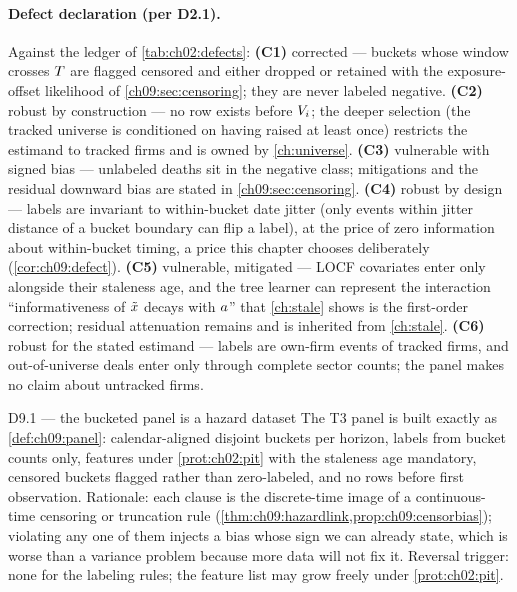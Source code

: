 \paragraph{Defect declaration (per D2.1).} Against the ledger of
\cref{tab:ch02:defects}: \textbf{(C1)} corrected --- buckets whose window
crosses $T$ are flagged censored and either dropped or retained with
the exposure-offset likelihood of \cref{ch09:sec:censoring}; they are
never labeled negative. \textbf{(C2)} robust by construction --- no row
exists before $V_i$; the deeper selection (the tracked universe is
conditioned on having raised at least once) restricts the estimand to
tracked firms and is owned by \cref{ch:universe}. \textbf{(C3)}
vulnerable with signed bias --- unlabeled deaths sit in the negative
class; mitigations and the residual downward bias are stated in
\cref{ch09:sec:censoring}. \textbf{(C4)} robust by design --- labels are
invariant to within-bucket date jitter (only events within jitter
distance of a bucket boundary can flip a label), at the price of zero
information about within-bucket timing, a price this chapter chooses
deliberately (\cref{cor:ch09:defect}). \textbf{(C5)} vulnerable,
mitigated --- LOCF covariates enter only alongside their staleness age,
and the tree learner can represent the interaction ``informativeness of
$\tilde{x}$ decays with $a$'' that \cref{ch:stale} shows is the
first-order correction; residual attenuation remains and is inherited
from \cref{ch:stale}. \textbf{(C6)} robust for the stated estimand ---
labels are own-firm events of tracked firms, and out-of-universe deals
enter only through complete sector counts; the panel makes no claim about
untracked firms.

\begin{decision}{D9.1 --- the bucketed panel is a hazard dataset}
The T3 panel is built exactly as \cref{def:ch09:panel}: calendar-aligned
disjoint buckets per horizon, labels from bucket counts only, features
under \cref{prot:ch02:pit} with the staleness age mandatory, censored
buckets flagged rather than zero-labeled, and no rows before first
observation. Rationale: each clause is the discrete-time image of a
continuous-time censoring or truncation rule
(\cref{thm:ch09:hazardlink,prop:ch09:censorbias}); violating any one of
them injects a bias whose sign we can already state, which is worse than
a variance problem because more data will not fix it. Reversal trigger:
none for the labeling rules; the feature list may grow freely under
\cref{prot:ch02:pit}.
\end{decision}

